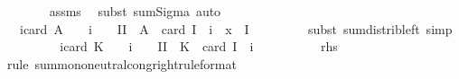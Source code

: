 \begin{isabellebody}
\ \ \ \ \ \ \isamarkupfalse%
\ assms\ \isamarkupfalse%
\ {\isacharparenleft}{\kern0pt}subst\ sum{\isachardot}{\kern0pt}Sigma{\isacharparenright}{\kern0pt}\ auto\isanewline
\ \ \ \ \isamarkupfalse%
\ \isamarkupfalse%
\ {\isachardoublequoteopen}{\isasymdots}\ {\isacharequal}{\kern0pt}\ {\isacharparenleft}{\kern0pt}{\isasymSum}i{\isacharequal}{\kern0pt}{}{\isachardot}{\kern0pt}{\isachardot}{\kern0pt}card\ A{\isachardot}{\kern0pt}\ {\isacharparenleft}{\kern0pt}{\isacharminus}{\kern0pt}\ {}{\isacharparenright}{\kern0pt}\ {\isacharcircum}{\kern0pt}\ {\isacharparenleft}{\kern0pt}i\ {\isacharplus}{\kern0pt}\ {}{\isacharparenright}{\kern0pt}\ {\isacharasterisk}{\kern0pt}\ {\isacharparenleft}{\kern0pt}{\isasymSum}I{\isacharbar}{\kern0pt}I\ {\isasymsubseteq}\ A\ {\isasymand}\ card\ I\ {\isacharequal}{\kern0pt}\ i\ {\isasymand}\ x\ {\isasymin}\ {\isasymInter}I{\isachardot}{\kern0pt}\ {}{\isacharparenright}{\kern0pt}{\isacharparenright}{\kern0pt}{\isachardoublequoteclose}\isanewline
\ \ \ \ \ \ \isamarkupfalse%
\ {\isacharparenleft}{\kern0pt}subst\ sum{\isacharunderscore}{\kern0pt}distrib{\isacharunderscore}{\kern0pt}left{\isacharparenright}{\kern0pt}\ simp\isanewline
\ \ \ \ \isamarkupfalse%
\ \isamarkupfalse%
\ {\isachardoublequoteopen}{\isasymdots}\ {\isacharequal}{\kern0pt}\ {\isacharparenleft}{\kern0pt}{\isasymSum}i{\isacharequal}{\kern0pt}{}{\isachardot}{\kern0pt}{\isachardot}{\kern0pt}card\ K{\isachardot}{\kern0pt}\ {\isacharparenleft}{\kern0pt}{\isacharminus}{\kern0pt}\ {}{\isacharparenright}{\kern0pt}\ {\isacharcircum}{\kern0pt}\ {\isacharparenleft}{\kern0pt}i\ {\isacharplus}{\kern0pt}\ {}{\isacharparenright}{\kern0pt}\ {\isacharasterisk}{\kern0pt}\ {\isacharparenleft}{\kern0pt}{\isasymSum}I{\isacharbar}{\kern0pt}I\ {\isasymsubseteq}\ K\ {\isasymand}\ card\ I\ {\isacharequal}{\kern0pt}\ i{\isachardot}{\kern0pt}\ {}{\isacharparenright}{\kern0pt}{\isacharparenright}{\kern0pt}{\isachardoublequoteclose}\isanewline
\ \ \ \ \ \ {\isacharparenleft}{\kern0pt}\ {\isachardoublequoteopen}{\isacharunderscore}{\kern0pt}\ {\isacharequal}{\kern0pt}\ {\isacharquery}{\kern0pt}rhs{\isachardoublequoteclose}{\isacharparenright}{\kern0pt}\isanewline
\ \ \ \ \isamarkupfalse%
\ {\isacharparenleft}{\kern0pt}rule\ sum{\isachardot}{\kern0pt}mono{\isacharunderscore}{\kern0pt}neutral{\isacharunderscore}{\kern0pt}cong{\isacharunderscore}{\kern0pt}right{\isacharbrackleft}{\kern0pt}rule{\isacharunderscore}{\kern0pt}format{\isacharbrackright}{\kern0pt}{\isacharparenright}{\kern0pt}\isanewline

\end{isabellebody}

